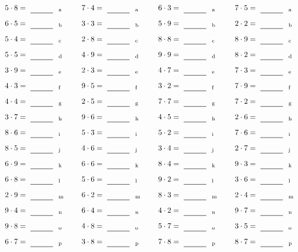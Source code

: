 \documentclass
[
  draft    = true,
  fontsize = 11pt,
  parskip  = half-
]
{scrartcl}
\begin{document}
\par\vfill\par
\begin{align*}
    \pline{5\cdot8}&=\rline{a}
  & \pline{7\cdot4}&=\rline{a}
  & \pline{6\cdot3}&=\rline{a}
  & \pline{7\cdot5}&=\rline{a} \\[1ex]
    \pline{6\cdot5}&=\rline{b}
  & \pline{3\cdot3}&=\rline{b}
  & \pline{5\cdot9}&=\rline{b}
  & \pline{2\cdot2}&=\rline{b} \\[1ex]
    \pline{5\cdot4}&=\rline{c}
  & \pline{2\cdot8}&=\rline{c}
  & \pline{8\cdot8}&=\rline{c}
  & \pline{8\cdot9}&=\rline{c} \\[1ex]
    \pline{5\cdot5}&=\rline{d}
  & \pline{4\cdot9}&=\rline{d}
  & \pline{9\cdot9}&=\rline{d}
  & \pline{8\cdot2}&=\rline{d} \\[1ex]
    \pline{3\cdot9}&=\rline{e}
  & \pline{2\cdot3}&=\rline{e}
  & \pline{4\cdot7}&=\rline{e}
  & \pline{7\cdot3}&=\rline{e} \\[1ex]
    \pline{4\cdot3}&=\rline{f}
  & \pline{9\cdot5}&=\rline{f}
  & \pline{3\cdot2}&=\rline{f}
  & \pline{7\cdot9}&=\rline{f} \\[1ex]
    \pline{4\cdot4}&=\rline{g}
  & \pline{2\cdot5}&=\rline{g}
  & \pline{7\cdot7}&=\rline{g}
  & \pline{7\cdot2}&=\rline{g} \\[1ex]
    \pline{3\cdot7}&=\rline{h}
  & \pline{9\cdot6}&=\rline{h}
  & \pline{4\cdot5}&=\rline{h}
  & \pline{2\cdot6}&=\rline{h} \\[1ex]
    \pline{8\cdot6}&=\rline{i}
  & \pline{5\cdot3}&=\rline{i}
  & \pline{5\cdot2}&=\rline{i}
  & \pline{7\cdot6}&=\rline{i} \\[1ex]
    \pline{8\cdot5}&=\rline{j}
  & \pline{4\cdot6}&=\rline{j}
  & \pline{3\cdot4}&=\rline{j}
  & \pline{2\cdot7}&=\rline{j} \\[1ex]
    \pline{6\cdot9}&=\rline{k}
  & \pline{6\cdot6}&=\rline{k}
  & \pline{8\cdot4}&=\rline{k}
  & \pline{9\cdot3}&=\rline{k} \\[1ex]
    \pline{6\cdot8}&=\rline{l}
  & \pline{5\cdot6}&=\rline{l}
  & \pline{9\cdot2}&=\rline{l}
  & \pline{3\cdot6}&=\rline{l} \\[1ex]
    \pline{2\cdot9}&=\rline{m}
  & \pline{6\cdot2}&=\rline{m}
  & \pline{8\cdot3}&=\rline{m}
  & \pline{2\cdot4}&=\rline{m} \\[1ex]
    \pline{9\cdot4}&=\rline{n}
  & \pline{6\cdot4}&=\rline{n}
  & \pline{4\cdot2}&=\rline{n}
  & \pline{9\cdot7}&=\rline{n} \\[1ex]
    \pline{9\cdot8}&=\rline{o}
  & \pline{4\cdot8}&=\rline{o}
  & \pline{5\cdot7}&=\rline{o}
  & \pline{3\cdot5}&=\rline{o} \\[1ex]
    \pline{6\cdot7}&=\rline{p}
  & \pline{3\cdot8}&=\rline{p}
  & \pline{7\cdot8}&=\rline{p}
  & \pline{8\cdot7}&=\rline{p}
\end{align*}
\end{document}
